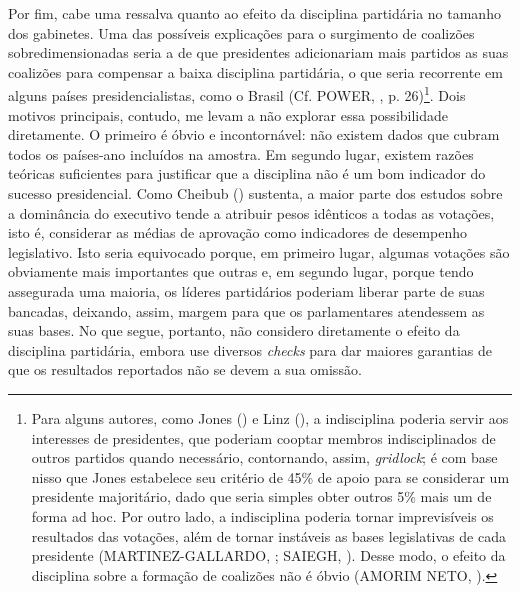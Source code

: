 Por fim, cabe uma ressalva quanto ao efeito da disciplina partidária no tamanho dos gabinetes. Uma das possíveis explicações para o surgimento de coalizões sobredimensionadas seria a de que presidentes adicionariam mais partidos as suas coalizões para compensar a baixa disciplina partidária, o que seria recorrente em alguns países presidencialistas, como o Brasil (Cf. POWER, \citeyear{power2010}, p. 26)\footnote{Para alguns autores, como Jones (\citeyear{jones1995}) e Linz (\citeyear{linz1990}), a indisciplina poderia servir aos interesses de presidentes, que poderiam cooptar membros indisciplinados de outros partidos quando necessário, contornando, assim, \textit{gridlock}; é com base nisso que Jones estabelece seu critério de 45\% de apoio para se considerar um presidente majoritário, dado que seria simples obter outros 5\% mais um de forma ad hoc.  Por outro lado, a indisciplina poderia tornar imprevisíveis os resultados das votações, além de tornar instáveis as bases legislativas de cada presidente (MARTINEZ-GALLARDO, \citeyear{martinez2012}; SAIEGH, \citeyear{saiegh2009}). Desse modo, o efeito da disciplina sobre a formação de coalizões não é óbvio (AMORIM NETO, \citeyear{neto2006}).}. Dois motivos principais, contudo, me levam a não explorar essa possibilidade diretamente. O primeiro é óbvio e incontornável: não existem dados que cubram todos os países-ano incluídos na amostra. Em segundo lugar, existem razões teóricas suficientes para justificar que a disciplina não é um bom indicador do sucesso presidencial. Como Cheibub (\citeyear{cheibub2007}) sustenta, a maior parte dos estudos sobre a dominância do executivo tende a atribuir pesos idênticos a todas as votações, isto é, considerar as médias de aprovação como indicadores de desempenho legislativo. Isto seria equivocado porque, em primeiro lugar, algumas votações são obviamente mais importantes que outras e, em segundo lugar, porque tendo assegurada uma maioria, os líderes partidários poderiam liberar parte de suas bancadas, deixando, assim, margem para que os parlamentares atendessem as suas bases. No que segue, portanto, não considero diretamente o efeito da disciplina partidária, embora use diversos \textit{checks} para dar maiores garantias de que os resultados reportados não se devem a sua omissão.
